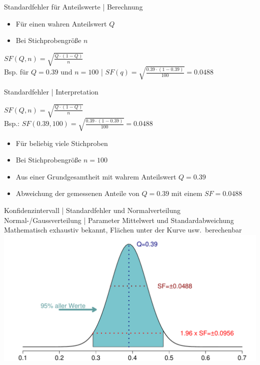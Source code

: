 \begin{frame}
  {Standardfehler für Anteilswerte | Berechnung}
  \begin{itemize}[<+->]
    \item Für einen wahren Anteilswert $Q$
    \item Bei Stichprobengröße $n$
  \end{itemize}
  \Halbzeile
  \begin{center}
    \alert{$SF(Q,n)=\sqrt{\frac{Q\cdot(1-Q)}{n}}$}\\
    \Doppelzeile
    Bsp. für $Q=0.39$ und $n=100$ | $SF(q)=\sqrt{\frac{0.39\cdot(1-0.39)}{100}}=0.0488$
  \end{center}
\end{frame}

\begin{frame}
  {Standardfehler | Interpretation}
  \begin{center}
    \alert{$SF(Q,n)=\sqrt{\frac{Q\cdot(1-Q)}{n}}$}\\

    \vspace{.1cm}
    Bsp.: $SF(0.39,100)=\sqrt{\frac{0.39\cdot(1-0.39)}{100}}=0.0488$
  \end{center}
  \Zeile
  \begin{itemize}[<+->]
    \item Für \alert{beliebig viele} Stichproben
    \item Bei \alert{Stichprobengröße $n=100$}
    \item Aus einer Grundgesamtheit mit \alert{wahrem Anteilswert $Q=0.39$}
      \Halbzeile
    \item Abweichung der gemessenen Anteile von $Q=0.39$ mit einem \alert{$SF=0.0488$}
  \end{itemize}
\end{frame}


\begin{frame}
  {Konfidenzintervall | Standardfehler und Normalverteilung}
  \alert{Normal-\slash Gaussverteilung} | Parameter \alert{Mittelwert} und \alert{Standardabweichung}\\
  \Viertelzeile
   Mathematisch exhaustiv bekannt, Flächen unter der Kurve usw.\ berechenbar\\
  \centering
  \includegraphics[height=0.75\textheight]{RVorlesung/ci95}
\end{frame}


